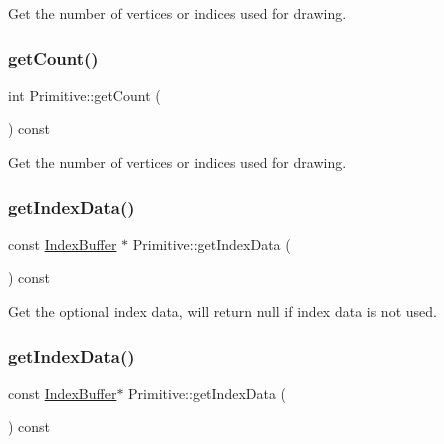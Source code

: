 Get the number of vertices or indices used for drawing. \mbox{\label{classPrimitive_afa0bf0c4ad511ce349b3018164f040ee}} 
\subsubsection{\texorpdfstring{get\+Count()}{getCount()}\hspace{0.1cm}{\footnotesize\ttfamily [2/2]}}
{\footnotesize\ttfamily int Primitive\+::get\+Count (\begin{DoxyParamCaption}{ }\end{DoxyParamCaption}) const\hspace{0.3cm}{\ttfamily [inline]}}

Get the number of vertices or indices used for drawing. \mbox{\label{classPrimitive_a7f0e018ab541640762d23f6a657d9bda}} 
\subsubsection{\texorpdfstring{get\+Index\+Data()}{getIndexData()}\hspace{0.1cm}{\footnotesize\ttfamily [1/2]}}
{\footnotesize\ttfamily const \hyperlink{classIndexBuffer}{Index\+Buffer} $\ast$ Primitive\+::get\+Index\+Data (\begin{DoxyParamCaption}{ }\end{DoxyParamCaption}) const}

Get the optional index data, will return null if index data is not used. \mbox{\label{classPrimitive_a81f76d64283ee3314e27cc34a4a4acd8}} 
\subsubsection{\texorpdfstring{get\+Index\+Data()}{getIndexData()}\hspace{0.1cm}{\footnotesize\ttfamily [2/2]}}
{\footnotesize\ttfamily const \hyperlink{classIndexBuffer}{Index\+Buffer}$\ast$ Primitive\+::get\+Index\+Data (\begin{DoxyParamCaption}{ }\end{DoxyParamCaption}) const}

